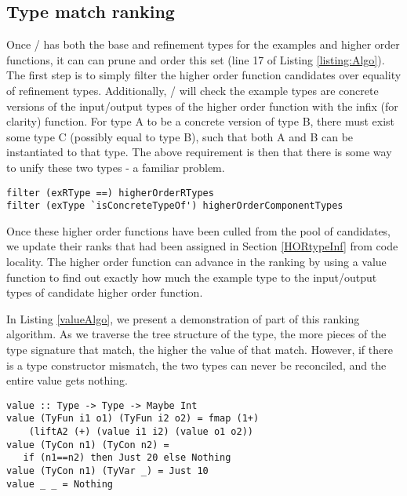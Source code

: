 \subsection{Type match ranking}\label{typeMatch}

Once \ourTool/ has both the base and refinement types for the examples and higher order functions, it can can prune and order this set (line 17 of Listing \ref{listing:Algo}).
The first step is to simply filter the higher order function candidates over equality of refinement types.
Additionally, \ourTool/ will check the example types are concrete versions of the input/output types of the higher order function with the infix (for clarity)  function.
For type A to be a concrete version of type B, there must exist some type C (possibly equal to type B), such that both A and B can be instantiated to that type.
The above requirement is then that there is some way to unify these two types - a familiar problem\cite{typeUnif}.

\begin{lstlisting}[caption=Pruning based on types]
filter (exRType ==) higherOrderRTypes
filter (exType `isConcreteTypeOf') higherOrderComponentTypes
\end{lstlisting}

Once these higher order functions have been culled from the pool of candidates, we update their ranks that had been assigned in Section \ref{HORtypeInf} from code locality.
The higher order function can advance in the ranking by using a value function to find out exactly how much the example type  to the input/output types of candidate higher order function.

In Listing \ref{valueAlgo}, we present a demonstration of part of this ranking algorithm.
As we traverse the tree structure of the type, the more pieces of the type signature that match, the higher the value of that match. 
However, if there is a type constructor mismatch, the two types can never be reconciled, and the entire value gets nothing.

\begin{lstlisting}[caption=Type closeness ranking algorithm (sample),label=valueAlgo]
value :: Type -> Type -> Maybe Int
value (TyFun i1 o1) (TyFun i2 o2) = fmap (1+) 
    (liftA2 (+) (value i1 i2) (value o1 o2))
value (TyCon n1) (TyCon n2) =
   if (n1==n2) then Just 20 else Nothing
value (TyCon n1) (TyVar _) = Just 10
value _ _ = Nothing
\end{lstlisting}

